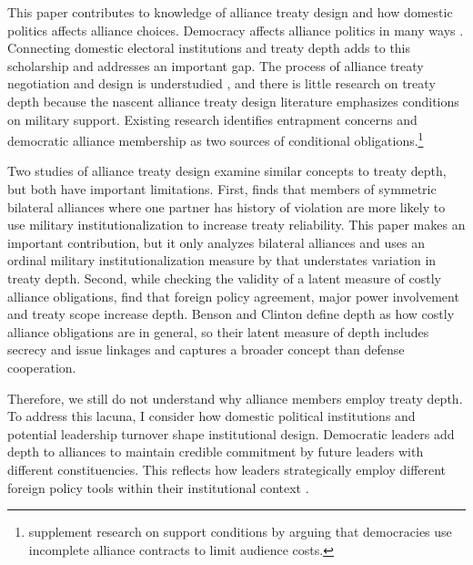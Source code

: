 \documentclass[12pt]{article}
\begin{document}
This paper contributes to knowledge of alliance treaty design and how domestic politics affects alliance choices.
Democracy affects alliance politics in many ways \citep{LaiReiter2000, GiblerWolford2006, Mattes2012a, Warren2016, McManusYarhi-Milo2017}. 
Connecting domestic electoral institutions and treaty depth adds to this scholarship and addresses an important gap.
The process of alliance treaty negotiation and design is understudied \citep{Poast2019a}, and there is little research on treaty depth because the nascent alliance treaty design literature emphasizes conditions on military support.
Existing research identifies entrapment concerns \citep{Kim2011, Benson2012} and democratic alliance membership \citep{Mattes2012, Chibaetal2015} as two sources of conditional obligations.\footnote{\citet{FjelstulReiter2019} supplement research on support conditions by arguing that democracies use incomplete alliance contracts to limit audience costs.} 


Two studies of alliance treaty design examine similar concepts to treaty depth, but both have important limitations.   
First, \citet{Mattes2012} finds that members of symmetric bilateral alliances where one partner has history of violation are more likely to use military institutionalization to increase treaty reliability. 
This paper makes an important contribution, but it only analyzes bilateral alliances and uses an ordinal military institutionalization measure by \citet{LeedsAnac2005} that understates variation in treaty depth.  
Second, while checking the validity of a latent measure of costly alliance obligations, \citet{BensonClinton2016} find that foreign policy agreement, major power involvement and treaty scope increase depth. 
Benson and Clinton define depth as how costly alliance obligations are in general, so their latent measure of depth includes secrecy and issue linkages and captures a broader concept than defense cooperation. 


Therefore, we still do not understand why alliance members employ treaty depth.
To address this lacuna, I consider how domestic political institutions and potential leadership turnover shape institutional design.
Democratic leaders add depth to alliances to maintain credible commitment by future leaders with different constituencies.  
This reflects how leaders strategically employ different foreign policy tools within their institutional context \citep{HydeSaunders2020}. 
\end{document}
